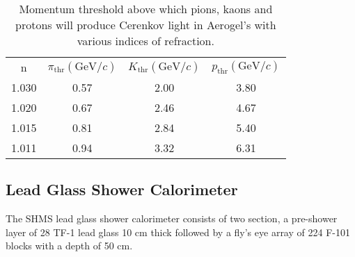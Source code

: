\begin{table}
\caption{Momentum threshold above which pions, kaons and protons will 
produce Cerenkov light in Aerogel's with various indices of refraction.
\label{tab:shms_aerogel}}
\begin{center}
\begin{tabular}{cccc}
  n& $\pi_{\textrm{thr}}(\textrm{GeV}/c)$ & $K_{\textrm{
  thr}}(\textrm{GeV}/c)$ & $p_{\textrm{thr}}(\textrm{GeV}/c)$\\
  1.030 & 0.57 & 2.00 & 3.80 \\
  1.020 & 0.67 & 2.46 & 4.67 \\
  1.015 & 0.81 & 2.84 & 5.40 \\
  1.011 & 0.94 & 3.32 & 6.31 \\
\end{tabular}
\end{center}
\end{table}



\subsection{Lead Glass Shower Calorimeter}

The SHMS lead glass shower calorimeter consists of two section, a
pre-shower layer of 28 TF-1 lead glass 10 cm thick followed by a fly's eye
array of 224 F-101 blocks with a depth of 50 cm.



